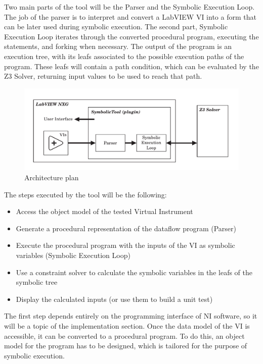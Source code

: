 Two main parts of the tool will be the Parser and the Symbolic Execution Loop. The job of the parser is to interpret and convert a LabVIEW VI into a form that can be later used during symbolic execution. The second part, Symbolic Execution Loop iterates through the converted procedural program, executing the statements, and forking when necessary. The output of the program is an execution tree, with its leafs associated to the possible execution paths of the program. These leafs will contain a path condition, which can be evaluated by the Z3 Solver, returning input values to be used to reach that path.
\begin{figure}
\includegraphics[width=150mm,keepaspectratio]{figures/architecture.pdf}
\caption{Architecture plan} 
\label{fig:architectureplan}
\end{figure}


The steps executed by the tool will be the following:

\begin{itemize}
  \item Access the object model of the tested Virtual Instrument
  \item Generate a procedural representation of the dataflow program (Parser)
  \item Execute the procedural program with the inputs of the VI as symbolic variables (Symbolic Execution Loop)
   \item Use a constraint solver to calculate the symbolic variables
in the leafs of the symbolic tree
     \item Display the calculated inputs (or use them to build a unit test)
  \end{itemize}

The first step depends entirely on the programming interface of NI software, so it will be a topic of the implementation section. Once the data model of the VI is accessible, it can be converted to a procedural program. To do this, an object model for the program has to be designed, which is tailored for the purpose of symbolic execution.


